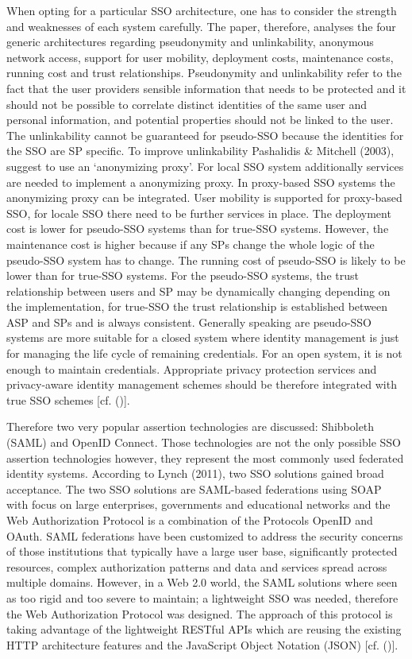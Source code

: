 {{		When opting for a particular SSO architecture, one has to consider the strength and weaknesses of each system carefully. The paper, therefore, analyses the four generic architectures regarding pseudonymity and unlinkability, anonymous network access, support for user mobility, deployment costs, maintenance costs, running cost and trust relationships. Pseudonymity and unlinkability refer to the fact that the user providers sensible information that needs to be protected and it should not be possible to correlate distinct identities of the same user and personal information, and potential properties should not be linked to the user. The unlinkability cannot be guaranteed for pseudo-SSO because the identities for the SSO are SP specific. To improve unlinkability   Pashalidis \& Mitchell (2003), suggest to use an ‘anonymizing proxy’. For local SSO system additionally services are needed to implement a anonymizing proxy. In proxy-based SSO systems the anonymizing proxy can be integrated. User mobility is supported for proxy-based SSO, for locale SSO there need to be further services in place. The deployment cost is lower for pseudo-SSO systems than for true-SSO systems. However, the maintenance cost is higher because if any SPs change the whole logic of the pseudo-SSO system has to change. The running cost of pseudo-SSO is likely to be lower than for true-SSO systems. For the pseudo-SSO systems, the trust relationship between users and SP may be dynamically changing depending on the implementation, for true-SSO the trust relationship is established between ASP and SPs and is always consistent. Generally speaking are pseudo-SSO systems are more suitable for a closed system where identity management is just for managing the life cycle of remaining credentials. For an open system, it is not enough to maintain credentials. Appropriate privacy protection services and privacy-aware identity management schemes should be therefore integrated with true SSO schemes [cf. (\cite{Pashalidis:2003:10.1007/3-540-45067-X_22})]. 
			
		Therefore two very popular assertion technologies are discussed: Shibboleth (SAML) and OpenID Connect. Those technologies are not the only possible SSO assertion technologies however, they represent the most commonly used federated identity systems. According to Lynch (2011), two SSO solutions gained broad acceptance. The two SSO solutions are SAML-based federations using SOAP with focus on large enterprises, governments and educational networks and the Web Authorization Protocol is a combination of the Protocols OpenID and OAuth. SAML federations have been customized to address the security concerns of those institutions that typically have a large user base, significantly protected resources, complex authorization patterns and data and services spread across multiple domains. However, in a Web 2.0 world, the SAML solutions where seen as too rigid and too severe to maintain; a lightweight SSO was needed, therefore the Web Authorization Protocol was designed. The approach of this protocol is taking advantage of the lightweight RESTful APIs which are reusing the existing HTTP architecture features and the JavaScript Object Notation (JSON) [cf. (\cite{Lynch:2017:IIG})].
			
}}

